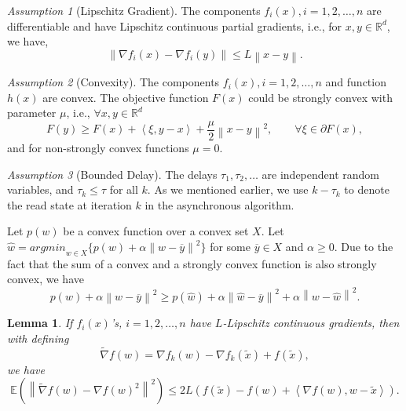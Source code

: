 \documentclass[10pt, conference, compsocconf]{IEEEtran}
\newcommand*{\R}{\mathbb{R}}
\newcommand*{\E}{\mathbb{E}}
\newcommand{\norm}[1]{\left\lVert#1\right\rVert}
\newcommand{\Iprod}[2]{\left\langle #1,#2\right\rangle}
\newtheorem{lemma}[theorem]{Lemma}
\theoremstyle{definition}
\theoremstyle{remark}
\newtheorem{Assumption}{Assumption}
\begin{document}
\begin{Assumption}[Lipschitz Gradient]\label{Assump1}
The components $f_i(x), i=1,2,\ldots,n$ are differentiable and have Lipschitz continuous partial gradients, i.e., for $x,y\in \R^d$, we have,
\begin{equation}
    \norm{\nabla f_i(x) - \nabla f_i(y)} \leq L \norm{x-y}.
\end{equation}
\end{Assumption}
\begin{Assumption}[Convexity]\label{Assump2}
The components $f_i(x), i=1,2,\ldots,n$ and function $h(x)$ are convex. The objective function $F(x)$ could be strongly convex with parameter $\mu$, i.e., 
$\forall x,y \in \R^d$
\begin{equation}\label{Convex:Eq1}
F(y)\geq F(x) + \Iprod{\xi}{y-x} + \frac{\mu}{2}\norm{x-y}^2,\qquad \forall \xi\in\partial F(x),
\end{equation}
and for non-strongly convex functions $\mu=0$. 
\end{Assumption}

\begin{Assumption}[Bounded Delay]\label{Assump3}
The delays $\tau_1,\tau_2,\ldots$ are independent random variables, and $\tau_k\leq \tau$ for all $k$. As we mentioned earlier, we use $k-\tau_k$ to denote the read state at iteration $k$ in the asynchronous algorithm.
\end{Assumption}

Let $p(w)$ be a convex function over a convex set $X$. Let $\hat{w} = {argmin}_{w\in X}\{p(w)+\alpha\norm{w-\overline{y}}^2\}$ for some $\overline{y}\in X$ and $\alpha\geq 0$. Due to the fact that the sum of a convex and a strongly convex function is also strongly convex,  we have
\begin{equation}\label{threepoint-convex}
 p(w)+\alpha\norm{w-\overline{y}}^2 \geq p(\hat{w})+\alpha\norm{\hat{w}-\overline{y}}^2+\alpha\norm{w-\hat{w}}^2.
\end{equation}


\begin{lemma}\label{lemma0}\cite{Johnson12,Allen-Zhu17} If $f_i(x)$'s, $i=1,2,\ldots,n$ have $L$-Lipschitz continuous gradients, then with defining 
\[
\widetilde{\nabla} f(w) = \nabla f_k(w) - \nabla f_k(\widetilde{x})+ f(\widetilde{x}),
\]
we have
\begin{equation}
\E\left(\norm{\widetilde{\nabla} f(w)-\nabla f(w)^2}^2\right) \leq 2L (f(\widetilde{x})-f(w)+\Iprod{\nabla f(w)}{w-\widetilde{x}}).
\end{equation}
 
\end{lemma}
\end{document}
